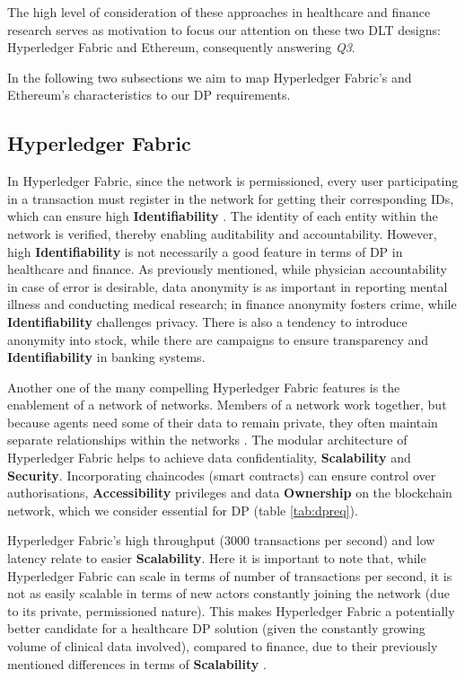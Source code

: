 The high level of consideration of these approaches in healthcare and finance research serves as motivation to focus our attention on these two DLT designs: Hyperledger Fabric and Ethereum, consequently answering \textit{Q3}. 

In the following two subsections we aim to map Hyperledger Fabric's and Ethereum's characteristics to our DP requirements.


\subsection{Hyperledger Fabric}
\label{ssec:fabric}

In Hyperledger Fabric, since the network is permissioned, every user participating in a transaction must register in the network for getting their corresponding IDs, which can ensure high \textbf{Identifiability} \cite{hl_84}. The identity of each entity within the network is verified, thereby enabling auditability and accountability. However, high \textbf{Identifiability} is not necessarily a good feature in terms of DP in healthcare and finance. As previously mentioned, while physician accountability in case of error is desirable, data anonymity is as important in reporting mental illness and conducting medical research; in finance anonymity fosters crime, while \textbf{Identifiability} challenges privacy. There is also a tendency to introduce anonymity into stock, while there are campaigns to ensure transparency and \textbf{Identifiability} in banking systems.

Another one of the many compelling Hyperledger Fabric features is the enablement of a network of networks. Members of a network work together, but because agents need some of their data to remain private, they often maintain separate relationships within the networks \cite{hyperledger}. The modular architecture of Hyperledger Fabric helps to achieve data confidentiality, \textbf{Scalability} and \textbf{Security}. Incorporating chaincodes (smart contracts) can ensure control over authorisations, \textbf{Accessibility} privileges and data \textbf{Ownership} on the blockchain network, which we consider essential for DP (table \ref{tab:dpreq}).

Hyperledger Fabric's high throughput (3000 transactions per second) and low latency relate to easier \textbf{Scalability}. Here it is important to note that, while Hyperledger Fabric can scale in terms of number of transactions per second, it is not as easily scalable in terms of new actors constantly joining the network (due to its private, permissioned nature). This makes Hyperledger Fabric a potentially better candidate for a healthcare DP solution (given the constantly growing volume of clinical data involved), compared to finance, due to their previously mentioned differences in terms of \textbf{Scalability} \cite{health_1}.

